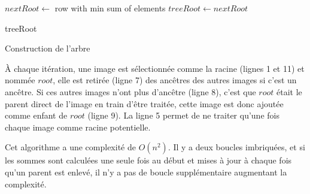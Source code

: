 \documentclass[utf8,final]{stageM2R} %
\begin{document}
\begin{algorithm}[]
  \LinesNumbered
  \BlankLine


  $nextRoot \leftarrow$ row with min sum of elements\;
  $treeRoot \leftarrow nextRoot$\;
  \BlankLine

  \ForAll{rows row of M}{
    $root \leftarrow nextRoot$\;
    mark $root$ as done\;
    \BlankLine
    \For{$i\leftarrow 0$ \KwTo n}{
      $row[i] \leftarrow 0$\;
      \If{sum of elements of row == 0} {
        add $i$ as child of $root$\;
      }
      \If{row has the smallest sum of elements and is not marked as done} {
        $nextRoot \leftarrow i$\;
      }
    }
  }
  \KwRet treeRoot
\caption{Construction de l'arbre}
\label{algo_}
\end{algorithm}
\vspace{5mm}

À chaque itération, une image est sélectionnée comme la racine (lignes 1 et 11) et nommée $root$, elle est retirée (ligne 7) des ancêtres des autres images si c'est un ancêtre. Si ces autres images n'ont plus d'ancêtre (ligne 8), c'est que $root$ était le parent direct de l'image en train d'être traitée, cette image est donc ajoutée comme enfant de $root$ (ligne 9). La ligne 5 permet de ne traiter qu'une fois chaque image comme racine potentielle.

Cet algorithme a une complexité de $O(n^{2})$. Il y a deux boucles imbriquées, et si les sommes sont calculées une seule fois au début et mises à jour à chaque fois qu'un parent est enlevé, il n'y a pas de boucle supplémentaire augmentant la complexité.


\end{document}
